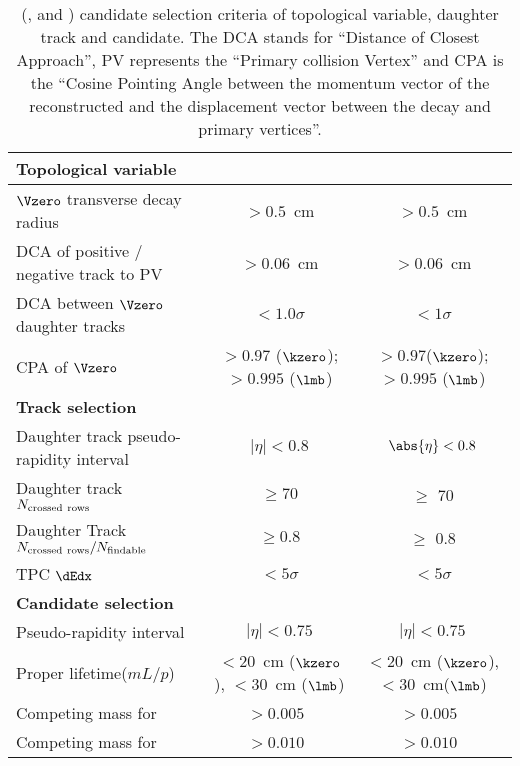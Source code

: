 \documentclass[ALICE,manyauthors]{cernphprep}
\begin{document}
\begin{table}[!ht]
	\begin{center}
		\caption{\Vzeros (\kzero, \lmb and \almb) candidate selection criteria of topological variable, daughter track and candidate.
			The DCA stands for ``Distance of Closest Approach'', PV represents the ``Primary collision Vertex'' and CPA is the ``Cosine Pointing Angle between the momentum vector of the reconstructed \Vzero and the displacement vector between the decay and primary vertices''.}
		\label{tab:V0Cut}
		\begin{tabularx}{\textwidth}{@{} lCC @{}}
			\toprule
			\textbf{Topological variable} & \textbf{\pp} & \textbf{\pPb} \\
			\midrule
			$\Vzero$ transverse decay radius      & $> 0.5$~cm   & $> 0.5$~cm \\
			DCA of positive / negative track to PV & $> 0.06$~cm  & $> 0.06$~cm \\
			DCA between $\Vzero$ daughter tracks  & $< 1.0\sigma$ & $< 1\sigma$ \\
			CPA of $\Vzero$ & $> 0.97$ ($\kzero$); $>0.995$ ($\lmb$) & $> 0.97$($\kzero$); $>0.995$ ($\lmb$) \\
			\midrule
			\textbf{Track selection} \\
			\midrule
			Daughter track pseudo-rapidity interval &$|\eta| < 0.8$ & $\abs{\eta} < 0.8$      \\
			Daughter track $N_{\rm crossed~rows}$                   & $\geq 70$  & $\geq$ 70 \\
			Daughter Track $N_{\rm crossed~rows}/N_{\rm findable}$  & $\geq 0.8$ & $\geq$ 0.8 \\
			TPC $\dEdx$ & $< 5\sigma$ & $< 5\sigma$ \\
			\midrule
			\textbf{Candidate selection} \\
			\midrule
			Pseudo-rapidity interval & $|\eta| < 0.75$ & $|\eta| < 0.75$ \\
			Proper lifetime($mL/p$)  & $< 20$~cm ($\kzero$), $< 30$~cm ($\lmb$) & $<20$~cm ($\kzero$), $< 30$~cm($\lmb$) \\
			Competing mass for \kzero & $> 0.005$~\GeVmass & $> 0.005$~\GeVmass \\
			Competing mass for \lmb  & $> 0.010$~\GeVmass & $> 0.010$~\GeVmass \\
			\bottomrule
		\end{tabularx}
	\end{center}
\end{table}
\end{document}
